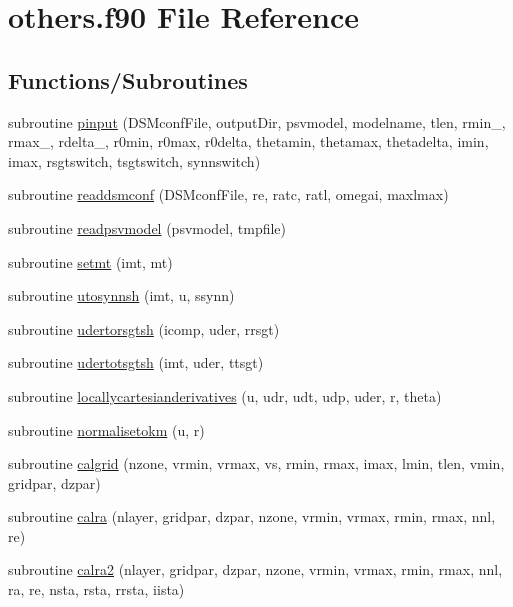 \hypertarget{others_8f90}{\section{others.\-f90 File Reference}
\label{others_8f90}
}
\subsection*{Functions/\-Subroutines}
\begin{DoxyCompactItemize}
\item 
subroutine \hyperlink{others_8f90_acfbe74ee3a1ca0cb00280244251b6342}{pinput} (D\-S\-Mconf\-File, output\-Dir, psvmodel, modelname, tlen, rmin\-\_\-, rmax\-\_\-, rdelta\-\_\-, r0min, r0max, r0delta, thetamin, thetamax, thetadelta, imin, imax, rsgtswitch, tsgtswitch, synnswitch)
\item 
subroutine \hyperlink{others_8f90_a119fa57ee4503ef8b04931a2d9407e5d}{readdsmconf} (D\-S\-Mconf\-File, re, ratc, ratl, omegai, maxlmax)
\item 
subroutine \hyperlink{others_8f90_a7076cd5066fb84abca20c26bb75d2429}{readpsvmodel} (psvmodel, tmpfile)
\item 
subroutine \hyperlink{others_8f90_a9b0bf10df75b570696b56b6d8c5fa917}{setmt} (imt, mt)
\item 
subroutine \hyperlink{others_8f90_aa11737f246f04214d03f7b5ed12c2fad}{utosynnsh} (imt, u, ssynn)
\item 
subroutine \hyperlink{others_8f90_a54e6afc34a6c117dc23a185ae149d995}{udertorsgtsh} (icomp, uder, rrsgt)
\item 
subroutine \hyperlink{others_8f90_aa36ffa4726f250829964248641aa2a3e}{udertotsgtsh} (imt, uder, ttsgt)
\item 
subroutine \hyperlink{others_8f90_a0aaa3f2ed2133f41229688450207bbac}{locallycartesianderivatives} (u, udr, udt, udp, uder, r, theta)
\item 
subroutine \hyperlink{others_8f90_a68c9ea8d2faab35be82106d4f3f62199}{normalisetokm} (u, r)
\item 
subroutine \hyperlink{others_8f90_aa2ea2b33b4a263b1b6b0d1328ef90869}{calgrid} (nzone, vrmin, vrmax, vs, rmin, rmax, imax, lmin, tlen, vmin, gridpar, dzpar)
\item 
subroutine \hyperlink{others_8f90_a21e62ff42c0d16e8b5e7614ca3fe7cda}{calra} (nlayer, gridpar, dzpar, nzone, vrmin, vrmax, rmin, rmax, nnl, re)
\item 
subroutine \hyperlink{others_8f90_a3c862375188116db1bc2458e2d489f4b}{calra2} (nlayer, gridpar, dzpar, nzone, vrmin, vrmax, rmin, rmax, nnl, ra, re, nsta, rsta, rrsta, iista)

\end{DoxyCompactItemize}
